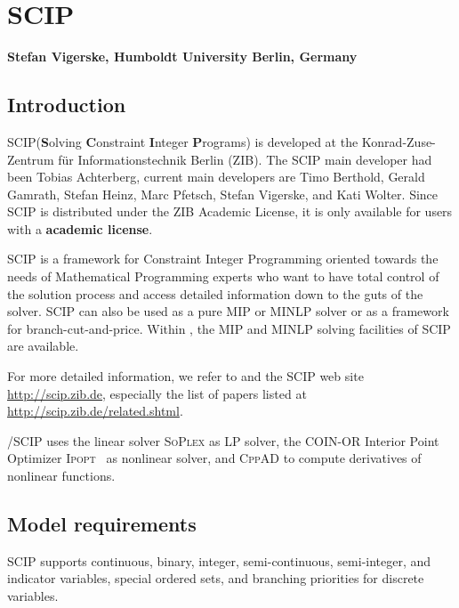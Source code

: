 
\newcommand{\SCIP}{\textsc{SCIP}\xspace}

\chapter{SCIP}
\textbf{Stefan Vigerske, Humboldt University Berlin, Germany}
\vspace{1cm}

\minitoc

\section{Introduction}

\SCIP (\textbf{S}olving \textbf{C}onstraint \textbf{I}nteger \textbf{P}rograms) is developed at the Konrad-Zuse-Zentrum f\"ur Informationstechnik Berlin (ZIB).
The \SCIP main developer had been Tobias Achterberg, current main developers are Timo Berthold, Gerald Gamrath, Stefan Heinz, Marc Pfetsch, Stefan Vigerske, and Kati Wolter.
Since \SCIP is distributed under the ZIB Academic License, it is only available for users with a \textbf{\GAMS academic license}.

\SCIP is a framework for Constraint Integer Programming oriented towards the needs of Mathematical Programming experts who want to have total control of the solution process and access detailed information down to the guts of the solver.
\SCIP can also be used as a pure MIP or MINLP solver or as a framework for branch-cut-and-price.
Within \GAMS, the MIP and MINLP solving facilities of \SCIP are available.

For more detailed information, we refer to \cite{Achterberg2007,Ach09,AchBeKoWo08,Berthold2006,BertholdHeinzVigerske2009,Vi12,Wolter2006} and the \SCIP web site \url{http://scip.zib.de}, especially the list of papers listed at \url{http://scip.zib.de/related.shtml}.

\GAMS/\SCIP uses the linear solver \textsc{SoPlex} \cite{Wunderling1996} as LP solver, the COIN-OR Interior Point Optimizer \textsc{Ipopt}~\cite{WaBi06} as nonlinear solver, and \textsc{CppAD} to compute derivatives of nonlinear functions.

\section{Model requirements}

\SCIP supports continuous, binary, integer, semi-continuous, semi-integer, and indicator variables, special ordered sets, and branching priorities for discrete variables.

